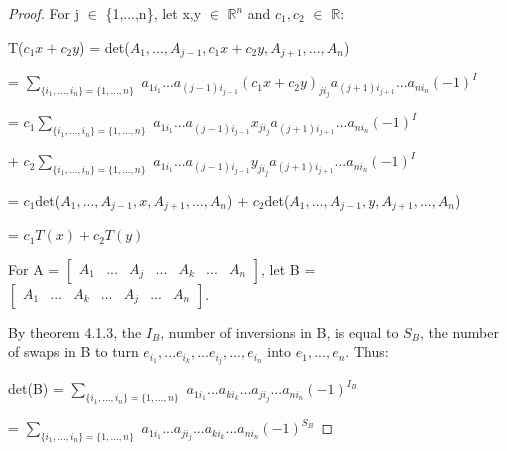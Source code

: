     \begin{proof}
        For j $\in$ \{1,...,n\},
        let x,y $\in$ $\mathbb{R}^n$ and $c_1,c_2$ $\in$ $\mathbb{R}$:

        \hspace{0.5cm}
        T($c_1x+c_2y$)
        = det($A_1,...,A_{j-1},c_1x+c_2y,A_{j+1},...,A_n$)

        \hspace{2.9cm}
        = $\sum_{\{i_1,...,i_n\} = \{1,...,n\}}$
            $a_{1i_1}...a_{(j-1)i_{j-1}}
            (c_1x+c_2y)_{ji_j}a_{(j+1)i_{j+1}}...a_{ni_n}(-1)^I$

        \hspace{2.9cm}
        = $c_1\sum_{\{i_1,...,i_n\} = \{1,...,n\}}$
            $a_{1i_1}...a_{(j-1)i_{j-1}}x_{ji_j}a_{(j+1)i_{j+1}}...a_{ni_n}(-1)^I$

        \hspace{3.4cm}
        + $c_2\sum_{\{i_1,...,i_n\} = \{1,...,n\}}$
            $a_{1i_1}...a_{(j-1)i_{j-1}}y_{ji_j}a_{(j+1)i_{j+1}}...a_{ni_n}(-1)^I$

        \hspace{2.9cm}
        = $c_1$det($A_1,...,A_{j-1},x,A_{j+1},...,A_n$)
            + $c_2$det($A_1,...,A_{j-1},y,A_{j+1},...,A_n$)

        \hspace{2.9cm}
        = $c_1T(x) + c_2T(y)$

        \vspace{0.3cm}

        For A =
        $\begin{bmatrix}
            A_1 & ... & A_j & ... & A_k & ... & A_n
        \end{bmatrix}$,
        let B =
        $\begin{bmatrix}
            A_1 & ... & A_k & ... & A_j & ... & A_n
        \end{bmatrix}$.

        By {\color{red} theorem 4.1.3}, the $I_B$, number of inversions in B, is
        equal to $S_B$, the number of swaps in B to turn
        $e_{i_1},...e_{i_k},...e_{i_j},...,e_{i_n}$
        into $e_1,...,e_n$. Thus:

        \hspace{0.5cm}
        det(B)
        = $\sum_{\{i_1,...,i_n\} = \{1,...,n\}}$
            $a_{1i_1}...a_{ki_k}...a_{ji_j}...a_{ni_n}(-1)^{I_B}$

        \hspace{1.85cm}
        = $\sum_{\{i_1,...,i_n\} = \{1,...,n\}}$
            $a_{1i_1}...a_{ji_j}...a_{ki_k}...a_{ni_n}(-1)^{S_B}$


\end{proof}
